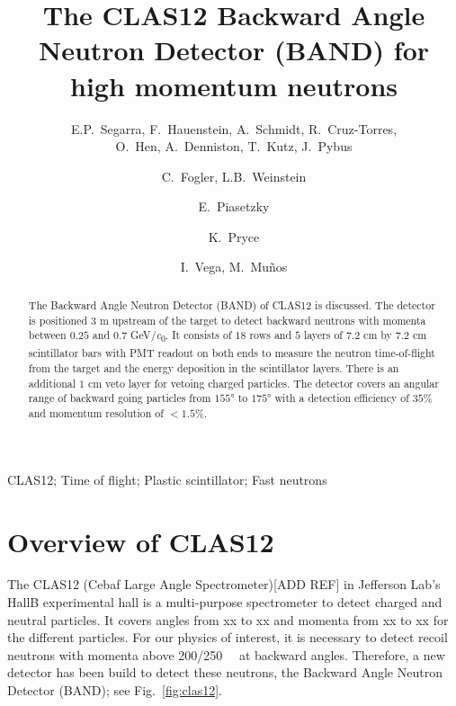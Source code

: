 \documentclass[review]{elsarticle}
\newcommand*{\MIT }{Massachusetts Institute of Technology, Cambridge, Massachusetts 02139, USA}
\newcommand*{\ODU}{Old Dominion University, Norfolk, Virginia 23529}
\newcommand*{\TAU }{School of Physics and Astronomy, Tel Aviv University, Tel Aviv 69978, Israel}
\begin{document}
\begin{frontmatter}

\title{The CLAS12 Backward Angle Neutron Detector (BAND) for high momentum neutrons}

\author{E.P.~Segarra, F.~Hauenstein, A.~Schmidt, R.~Cruz-Torres, \\O.~Hen, A.~Denniston, T.~Kutz, J.~Pybus}
\address{\MIT}
\author{C.~Fogler, L.B.~Weinstein}
\address{\ODU}
\author{E.~Piasetzky}
\address{\TAU}
\author{K.~Pryce}
\address{Orsay}
\author{I.~Vega, M.~Mu\~nos}
\address{UTFSM}

\author[]{}
\ead[]{}

\begin{abstract}
The Backward Angle Neutron Detector (BAND) of CLAS12 is discussed. The detector is positioned $3$ \si{\meter} upstream of the target to 
detect backward neutrons with momenta between $0.25$ and $0.7$ \si{\GeV/\clight}. It consists of $18$ rows and $5$ layers of $7.2$ \si{\centi\meter} 
by $7.2$ \si{\centi\meter} scintillator bars with PMT readout on both ends to measure the neutron time-of-flight from the target and the 
energy deposition in the scintillator layers. There is an additional $1$ \si{\centi\meter} veto layer for vetoing charged particles. The detector 
covers an angular range of backward going particles from $155$\si{\degree} to $175$\si{\degree} with a detection efficiency of 
$35$\% and momentum resolution of $<1.5$\%.
\end{abstract}

\begin{keyword}
CLAS12; Time of flight; Plastic scintillator; Fast neutrons
\end{keyword}
\end{frontmatter}

\linenumbers

\section{Overview of CLAS12}


The CLAS12 (Cebaf Large Angle Spectrometer)[ADD REF] in Jefferson Lab's HallB experimental hall is a multi-purpose spectrometer to detect charged and neutral particles. It covers angles from xx to xx and momenta from xx to xx for the different particles. For our physics of interest, it is necessary to detect recoil neutrons with momenta above \SI{200/250}{\mega\eVperc} at backward angles. Therefore, a new detector has been build to detect these neutrons, the Backward Angle Neutron Detector (BAND); see Fig.~\ref{fig:clas12}.
\end{document}
